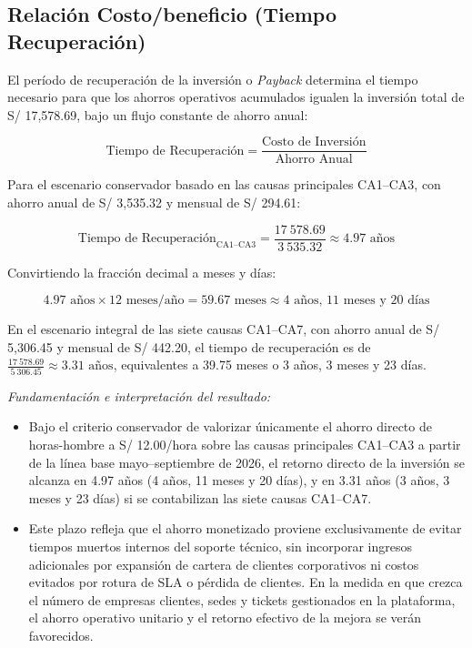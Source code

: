 \subsection{Relación Costo/beneficio (Tiempo Recuperación)}

El período de recuperación de la inversión o \textit{Payback} determina el tiempo necesario para que los ahorros operativos acumulados igualen la inversión total de S/ 17,578.69, bajo un flujo constante de ahorro anual:

\[
\text{Tiempo de Recuperación} = \frac{\text{Costo de Inversión}}{\text{Ahorro Anual}}
\]

Para el escenario conservador basado en las causas principales CA1–CA3, con ahorro anual de S/ 3,535.32 y mensual de S/ 294.61:

\[
\text{Tiempo de Recuperación}_{\text{CA1–CA3}} = \frac{17\ 578.69}{3\ 535.32} \approx 4.97\text{ años}
\]

Convirtiendo la fracción decimal a meses y días:

\[
4.97\text{ años} \times 12\text{ meses/año} = 59.67\text{ meses} \approx 4\text{ años, } 11\text{ meses y } 20\text{ días}
\]

En el escenario integral de las siete causas CA1–CA7, con ahorro anual de S/ 5,306.45 y mensual de S/ 442.20, el tiempo de recuperación es de $\frac{17\ 578.69}{5\ 306.45} \approx 3.31\text{ años}$, equivalentes a 39.75 meses o 3 años, 3 meses y 23 días.

\noindent\textit{Fundamentación e interpretación del resultado:}
\begin{itemize}[leftmargin=1.27cm]
    \item Bajo el criterio conservador de valorizar únicamente el ahorro directo de horas-hombre a S/ 12.00/hora sobre las causas principales CA1–CA3 a partir de la línea base mayo–septiembre de 2026, el retorno directo de la inversión se alcanza en 4.97 años (4 años, 11 meses y 20 días), y en 3.31 años (3 años, 3 meses y 23 días) si se contabilizan las siete causas CA1–CA7.
    \item Este plazo refleja que el ahorro monetizado proviene exclusivamente de evitar tiempos muertos internos del soporte técnico, sin incorporar ingresos adicionales por expansión de cartera de clientes corporativos ni costos evitados por rotura de SLA o pérdida de clientes. En la medida en que crezca el número de empresas clientes, sedes y tickets gestionados en la plataforma, el ahorro operativo unitario y el retorno efectivo de la mejora se verán favorecidos.
\end{itemize}